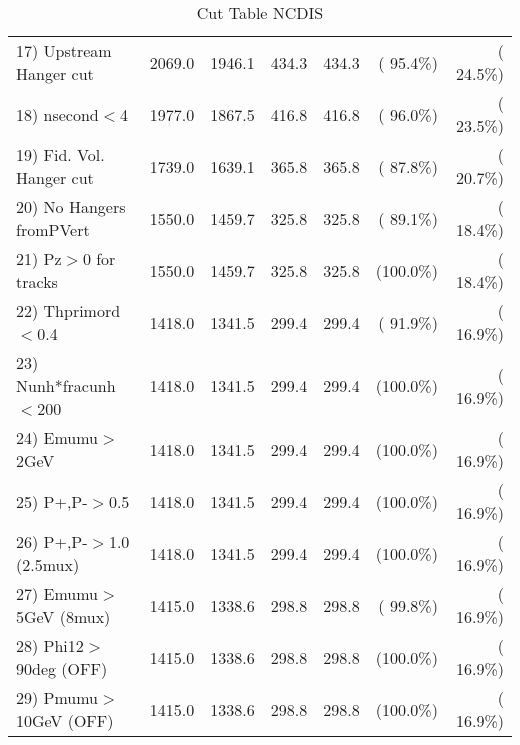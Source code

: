 \begin{table}[h!]
\begin{tabular}{||l||r|r|r|r|r|r||}
 17) Upstream Hanger cut  &       2069.0 &       1946.1 &        434.3 &        434.3 & ( 95.4\%) & ( 24.5\%) \\
 18) nsecond$<$4          &       1977.0 &       1867.5 &        416.8 &        416.8 & ( 96.0\%) & ( 23.5\%) \\
 19) Fid. Vol. Hanger cut &       1739.0 &       1639.1 &        365.8 &        365.8 & ( 87.8\%) & ( 20.7\%) \\
 20) No Hangers fromPVert &       1550.0 &       1459.7 &        325.8 &        325.8 & ( 89.1\%) & ( 18.4\%) \\
 21) Pz$>$0 for tracks    &       1550.0 &       1459.7 &        325.8 &        325.8 & (100.0\%) & ( 18.4\%) \\
 22) Thprimord$<$0.4      &       1418.0 &       1341.5 &        299.4 &        299.4 & ( 91.9\%) & ( 16.9\%) \\
 23) Nunh*fracunh$<$200   &       1418.0 &       1341.5 &        299.4 &        299.4 & (100.0\%) & ( 16.9\%) \\
 24) Emumu$>$2GeV         &       1418.0 &       1341.5 &        299.4 &        299.4 & (100.0\%) & ( 16.9\%) \\
 25) P+,P-$>$0.5          &       1418.0 &       1341.5 &        299.4 &        299.4 & (100.0\%) & ( 16.9\%) \\
 26) P+,P-$>$1.0 (2.5mux) &       1418.0 &       1341.5 &        299.4 &        299.4 & (100.0\%) & ( 16.9\%) \\
 27) Emumu$>$5GeV  (8mux) &       1415.0 &       1338.6 &        298.8 &        298.8 & ( 99.8\%) & ( 16.9\%) \\
 28) Phi12$>$90deg  (OFF) &       1415.0 &       1338.6 &        298.8 &        298.8 & (100.0\%) & ( 16.9\%) \\
 29) Pmumu$>$10GeV  (OFF) &       1415.0 &       1338.6 &        298.8 &        298.8 & (100.0\%) & ( 16.9\%) \\
 \hline
 \hline
 \end{tabular}
 \caption{Cut Table  NCDIS    }
 \label{tab-cutcohjpsi-mumu_ncdis}
 \end{table}
